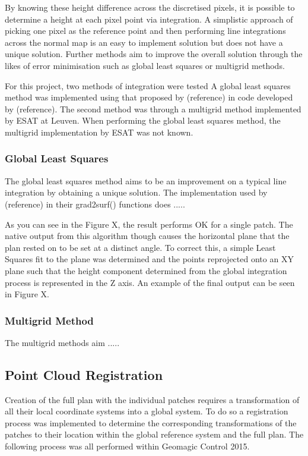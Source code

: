 	By knowing these height difference across the discretised pixels, it is possible to determine a height at each pixel point via integration. A simplistic approach of picking one pixel as the reference point and then performing line integrations across the normal map is an easy to implement solution but does not have a unique solution. Further methods aim to improve the overall solution through the likes of error minimisation such as global least squares or multigrid methods.
	
	For this project, two methods of integration were tested A global least squares method was implemented using that proposed by (reference) in code developed by (reference). The second method was through a multigrid method implemented by ESAT at Leuven. When performing the global least squares method, the multigrid implementation by ESAT was not known.
	
	\subsubsection{Global Least Squares}
	\label{sec:GlobalLeastSquares}
	The global least squares method aims to be an improvement on a typical line integration by obtaining a unique solution. The implementation used by (reference) in their grad2surf() functions does .....
	
	As you can see in the Figure X, the result performs OK for a single patch. The native output from this algorithm though causes the horizontal plane that the plan rested on to be set at a distinct angle. To correct this, a simple Least Squares fit to the plane was determined and the points reprojected onto an XY plane such that the height component determined from the global integration process is represented in the Z axis. An example of the final output can be seen in Figure X.
	
	\subsubsection{Multigrid Method}
	\label{sec:MultigridMethod}
	The multigrid methods aim .....
				
	\subsection{Point Cloud Registration}
	\label{sec:PointCloudRegistration}
	Creation of the full plan with the individual patches requires a transformation of all their local coordinate systems into a global system. To do so a registration process was implemented to determine the corresponding transformations of the patches to their location within the global reference system and the full plan. The following process was all performed within Geomagic Control 2015.
	
